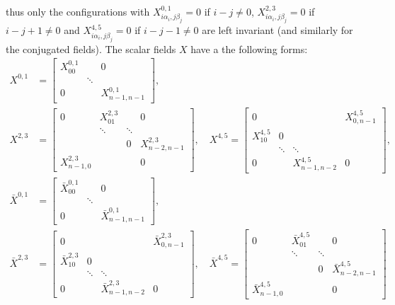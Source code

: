         thus only the configurations with $X^{0,1}_{i\alpha_i,j\beta_j}=0$ if $i-j\neq0$, $X^{2,3}_{i\alpha_i,j\beta_j}=0$ if $i-j+1\neq0$ and $X^{4,5}_{i\alpha_i,j\beta_j}=0$ if $i-j-1\neq0$ are left invariant (and similarly for the conjugated fields). The scalar fields $X$ have a the following forms:
        {\small
        \begin{align}
            X^{0,1}&=
            \begin{bmatrix}
                X^{0,1}_{00} &  & 0 \\
                 & \ddots & \\
                0 & & X^{0,1}_{n-1,n-1}
            \end{bmatrix},\\
            X^{2,3}&=
            \begin{bmatrix}
                0 & X^{2,3}_{01} & & 0 \\
                 & \ddots & \ddots & \\
                 & & 0 & X^{2,3}_{n-2,n-1} \\
                X^{2,3}_{n-1,0} & & & 0 
            \end{bmatrix},\quad
            X^{4,5}=
            \begin{bmatrix}
                0 & & & X^{4,5}_{0,n-1} \\
                X^{4,5}_{10} & 0 & & \\
                 & \ddots & \ddots  & \\
                0 & & X^{4,5}_{n-1,n-2} & 0
            \end{bmatrix},\\
            \bar{X}^{0,1}&=
            \begin{bmatrix}
                \bar{X}^{0,1}_{00} &  & 0 \\
                 & \ddots & \\
                0 & & \bar{X}^{0,1}_{n-1,n-1}
            \end{bmatrix},\\
            \bar{X}^{2,3}&=
            \begin{bmatrix}
                0 & & & \bar{X}^{2,3}_{0,n-1} \\
                \bar{X}^{2,3}_{10} & 0 & & \\
                 & \ddots & \ddots  & \\
                0 & & \bar{X}^{2,3}_{n-1,n-2} & 0
            \end{bmatrix},\quad
            \bar{X}^{4,5}=
            \begin{bmatrix}
                0 & \bar{X}^{4,5}_{01} & & 0 \\
                 & \ddots & \ddots & \\
                 & & 0 & \bar{X}^{4,5}_{n-2,n-1} \\
                 \bar{X}^{4,5}_{n-1,0} & & & 0
            \end{bmatrix}
        \end{align}}

